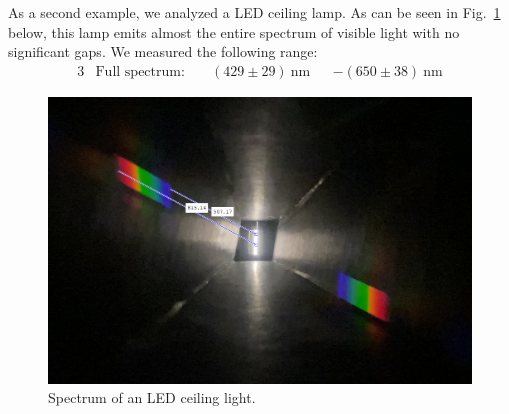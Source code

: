 As a second example, we analyzed a LED ceiling lamp. As can be seen in Fig.~\ref{fig_lamp2} below, this lamp
emits almost the entire spectrum of visible light with no significant gaps. We measured the following range:
\begin{alignat}{3}
    &\text{Full spectrum:} \; &&(429 \pm 29)~\si{\nano\meter} & &- (650 \pm 38)~\si{\nano\meter} \nonumber
\end{alignat}
\vspace{-2em}
\begin{figure}[H]
    \centering
    \includegraphics[scale = 0.38]{src/images/lamp2_meas.png}
    \caption{Spectrum of an LED ceiling light.}\label{fig_lamp2}
\end{figure}


